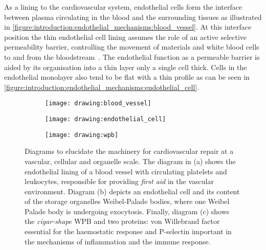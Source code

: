 As a lining to the cardiovascular system, endothelial cells form the interface between plasma circulating in the blood and the surrounding tissues as illustrated in \autoref{figure:introduction:endothelial_mechanisms:blood_vessel}. At this interface position the thin endothelial cell lining assumes the role of an active selective permeability barrier, controlling the movement of materials and white blood cells to and from the bloodstream~\cite{Alberts2002}. The endothelial function as a permeable barrier is aided by its organisation into a thin layer only a single cell thick. Cells in the endothelial  monolayer also tend to be flat with a thin profile as can be seen in \autoref{figure:introduction:endothelial_mechanisms:endothelial_cell}.

\begin{figure}[htbp]\centering
\begin{minipage}{0.49\textwidth}
	\begin{subfigure}[b]{\linewidth}
		\centering
		\texttt{[image: drawing:blood\_vessel]}
		\caption{}
		\label{figure:introduction:endothelial_mechanisms:blood_vessel}
		\vspace{1ex}
	\end{subfigure}
\end{minipage}
\begin{minipage}{0.49\textwidth}
	\begin{subfigure}[b]{\linewidth}
		\centering
		\texttt{[image: drawing:endothelial\_cell]}
		\caption{}
		\label{figure:introduction:endothelial_mechanisms:endothelial_cell}
		\vspace{10.5ex}
	\end{subfigure}
	\begin{subfigure}[b]{\linewidth}
		\centering
		\texttt{[image: drawing:wpb]}
		\caption{}
		\label{figure:introduction:endothelial_mechanisms:wpb}
		\vspace{1ex}
	\end{subfigure}
\end{minipage}
\caption[Endothelial mechanisms for cardiovascular repair at a vascular, cellular and organelle scale]{Diagrams to elucidate the machinery for cardiovascular repair at a vascular, cellular and organelle scale. The diagram in (a) shows the endothelial lining of a blood vessel with circulating platelets and leukocytes, responsible for providing \emph{first aid} in the vascular environment. Diagram (b) depicts an endothelial cell and its content of the storage organelles Weibel-Palade bodies, where one Weibel Palade body is undergoing exocytosis. Finally, diagram (c) shows the \emph{cigar-shape} WPB and two proteins: von Willebrand factor essential for the haemostatic response and P-selectin important in the mechanisms of inflammation and the immune response.}
\label{figure:endothelial_mechanisms}
\end{figure}
